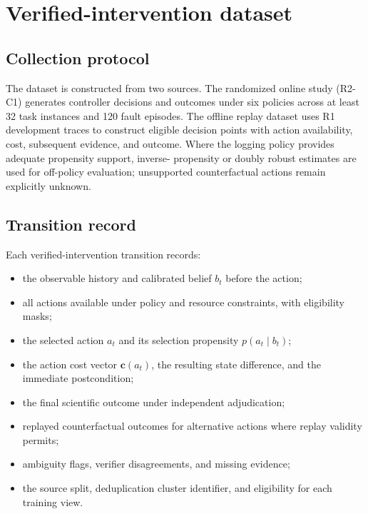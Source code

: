 \section{Verified-intervention dataset}
\label{sec:dataset}

\subsection{Collection protocol}

The dataset is constructed from two sources. The randomized online study
(R2-C1) generates controller decisions and outcomes under six policies
across at least 32 task instances and 120 fault episodes. The offline
replay dataset uses R1 development traces to construct eligible decision
points with action availability, cost, subsequent evidence, and outcome.
Where the logging policy provides adequate propensity support, inverse-
propensity or doubly robust estimates are used for off-policy evaluation;
unsupported counterfactual actions remain explicitly unknown.

\subsection{Transition record}

Each verified-intervention transition records:

\begin{itemize}
    \item the observable history and calibrated belief $b_t$ before the action;
    \item all actions available under policy and resource constraints, with
          eligibility masks;
    \item the selected action $a_t$ and its selection propensity
          $p(a_t \mid b_t)$;
    \item the action cost vector $\mathbf{c}(a_t)$, the resulting state
          difference, and the immediate postcondition;
    \item the final scientific outcome under independent adjudication;
    \item replayed counterfactual outcomes for alternative actions where
          replay validity permits;
    \item ambiguity flags, verifier disagreements, and missing evidence;
    \item the source split, deduplication cluster identifier, and
          eligibility for each training view.
\end{itemize}

